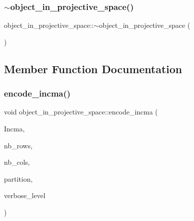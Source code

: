\mbox{\label{classobject__in__projective__space_ac2637c804ab163d90e54008bce0580af}} 
\subsubsection{\texorpdfstring{$\sim$object\+\_\+in\+\_\+projective\+\_\+space()}{~object\_in\_projective\_space()}}
{\footnotesize\ttfamily object\+\_\+in\+\_\+projective\+\_\+space\+::$\sim$object\+\_\+in\+\_\+projective\+\_\+space (\begin{DoxyParamCaption}{ }\end{DoxyParamCaption})}



\subsection{Member Function Documentation}
\mbox{\label{classobject__in__projective__space_a56b160e9f38e52c4e55a6be5342a546e}} 
\subsubsection{\texorpdfstring{encode\+\_\+incma()}{encode\_incma()}}
{\footnotesize\ttfamily void object\+\_\+in\+\_\+projective\+\_\+space\+::encode\+\_\+incma (\begin{DoxyParamCaption}\item[{\mbox{\hyperlink{galois_8h_a09fddde158a3a20bd2dcadb609de11dc}{I\+NT}} $\ast$\&}]{Incma,  }\item[{\mbox{\hyperlink{galois_8h_a09fddde158a3a20bd2dcadb609de11dc}{I\+NT}} \&}]{nb\+\_\+rows,  }\item[{\mbox{\hyperlink{galois_8h_a09fddde158a3a20bd2dcadb609de11dc}{I\+NT}} \&}]{nb\+\_\+cols,  }\item[{\mbox{\hyperlink{galois_8h_a09fddde158a3a20bd2dcadb609de11dc}{I\+NT}} $\ast$\&}]{partition,  }\item[{\mbox{\hyperlink{galois_8h_a09fddde158a3a20bd2dcadb609de11dc}{I\+NT}}}]{verbose\+\_\+level }\end{DoxyParamCaption})}

